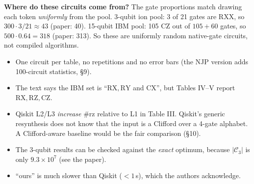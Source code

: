 \documentclass[11pt,a4paper]{article}
\newcommand{\RX}{\mathrm{RX}}\newcommand{\RY}{\mathrm{RY}}\newcommand{\RZ}{\mathrm{RZ}}
\newcommand{\RXX}{\mathrm{RXX}}\newcommand{\CZ}{\mathrm{CZ}}\newcommand{\CNOT}{\mathrm{CNOT}}
\begin{document}
\begin{intuition}
\textbf{Where do these circuits come from?} The gate proportions match drawing each token \emph{uniformly} from the
pool. 3-qubit ion pool: 3 of 21 gates are $\RXX$, so $300\cdot3/21\approx43$ (paper: 40). 15-qubit IBM pool: 105 $\CZ$ out of
$105+60$ gates, so $500\cdot0.64=318$ (paper: 313). So these are uniformly random native-gate circuits, not compiled algorithms.
\end{intuition}
\begin{careful}
\begin{itemize}[nosep]
\item One circuit per table, no repetitions and no error bars (the NJP version adds 100-circuit statistics, \S9).
\item The text says the IBM set is ``$\RX,\RY$ and CX'', but Tables IV--V report $\RX,\RZ,\CZ$.
\item Qiskit L2/L3 \emph{increase} \#rz relative to L1 in Table III. Qiskit's generic resynthesis does not know that the
  input is a Clifford over a 4-gate alphabet. A Clifford-aware baseline would be the fair comparison (\S10).
\item The 3-qubit results can be checked against the \emph{exact} optimum, because $|\mathcal C_3|$ is only $9.3\times10^7$
  (see the paper).
\item ``ours'' is much slower than Qiskit ($<1$\,s), which the authors acknowledge.
\end{itemize}
\end{careful}
\end{document}

